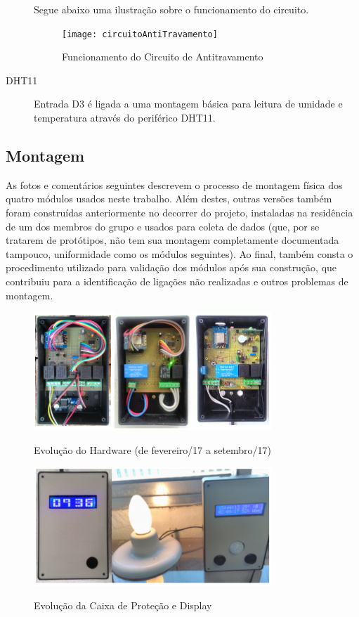 \begin{description}
Segue abaixo uma ilustração sobre o funcionamento do circuito.

\begin{figure}[H]
	\centering
	\caption{Funcionamento do Circuito de Antitravamento}
  \texttt{[image: circuitoAntiTravamento]}
\label{fig:circuitoAntiTravamento}
\end{figure}

\item [DHT11] Entrada D3 é ligada a uma montagem básica para leitura de umidade e temperatura através do periférico DHT11.

\end{description}

\subsection {Montagem}

As fotos e comentários seguintes descrevem o processo de montagem física dos quatro módulos usados neste trabalho. Além destes, outras versões também foram construídas anteriormente no decorrer do projeto, instaladas na residência de um dos membros do grupo e usados para coleta de dados (que, por se tratarem de protótipos, não tem sua montagem completamente documentada tampouco, uniformidade como os módulos seguintes).
Ao final, também consta o procedimento utilizado para validação dos módulos após sua construção, que contribuiu para a identificação de ligações não realizadas e outros problemas de montagem.

\begin{figure}[H]
	\centering
	\caption{Evolução do Hardware (de fevereiro/17 a setembro/17)}
	\includegraphics[width=0.8\textwidth]{evolHW}
	\label{fig:evolHW}
\end{figure}

\begin{figure}[H]
	\centering
	\caption{Evolução da Caixa de Proteção e Display}
	\includegraphics[width=0.8\textwidth]{evolProtDisplay}
	\label{fig:evolProtDisplay}
\end{figure}

